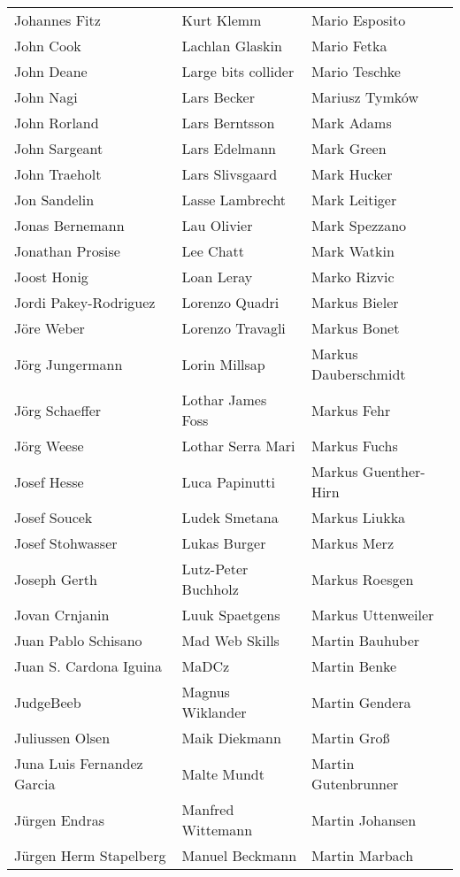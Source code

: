 \begin{tabular}{p{4.5cm}p{4.5cm}p{4.5cm}}
Johannes Fitz & Kurt Klemm & Mario Esposito \\
John Cook & Lachlan Glaskin & Mario Fetka \\
John Deane & Large bits collider & Mario Teschke \\
John Nagi & Lars Becker & Mariusz Tymków \\
John Rorland & Lars Berntsson & Mark Adams \\
John Sargeant & Lars Edelmann & Mark Green \\
John Traeholt & Lars Slivsgaard & Mark Hucker \\
Jon Sandelin & Lasse Lambrecht & Mark Leitiger \\
Jonas Bernemann & Lau Olivier & Mark Spezzano \\
Jonathan Prosise & Lee Chatt & Mark Watkin \\
Joost Honig & Loan Leray & Marko Rizvic \\
Jordi Pakey-Rodriguez & Lorenzo Quadri & Markus Bieler \\
Jöre Weber & Lorenzo Travagli & Markus Bonet \\
Jörg Jungermann & Lorin Millsap & Markus Dauberschmidt \\
Jörg Schaeffer & Lothar James Foss & Markus Fehr \\
Jörg Weese & Lothar Serra Mari & Markus Fuchs \\
Josef Hesse & Luca Papinutti & Markus Guenther-Hirn \\
Josef Soucek & Ludek Smetana & Markus Liukka \\
Josef Stohwasser & Lukas Burger & Markus Merz \\
Joseph Gerth & Lutz-Peter Buchholz & Markus Roesgen \\
Jovan Crnjanin & Luuk Spaetgens & Markus Uttenweiler \\
Juan Pablo Schisano & Mad Web Skills & Martin Bauhuber \\
Juan S. Cardona Iguina & MaDCz & Martin Benke \\
JudgeBeeb & Magnus Wiklander & Martin Gendera \\
Juliussen Olsen & Maik Diekmann & Martin Groß \\
Juna Luis Fernandez Garcia & Malte Mundt & Martin Gutenbrunner \\
Jürgen Endras & Manfred Wittemann & Martin Johansen \\
Jürgen Herm Stapelberg & Manuel Beckmann & Martin Marbach \\

\end{tabular}
